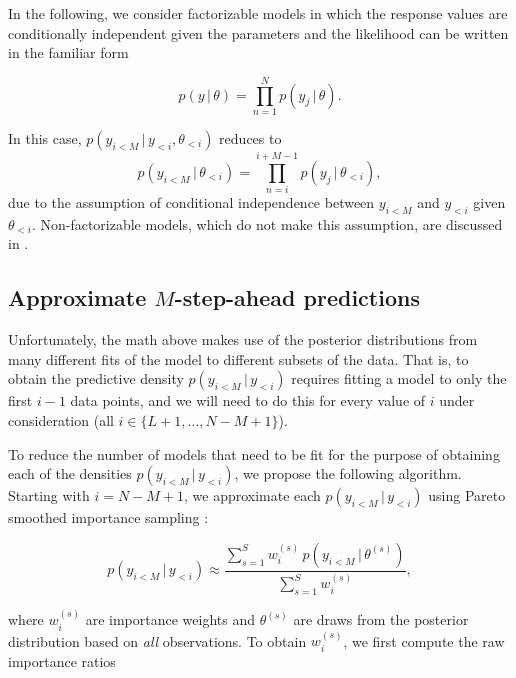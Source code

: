 \documentclass[american,]{article}
\begin{document}
In the following, we consider factorizable models in which the response
values are conditionally independent given the parameters and the
likelihood can be written in the familiar form

\begin{equation}
p(y \,|\, \theta) = \prod_{n=1}^N p(y_j \,|\, \theta).
\end{equation}

In this case, \(p(y_{i<M} \,|\, y_{<i}, \theta_{<i})\) reduces to
\begin{equation}
p(y_{i<M} \,|\, \theta_{<i}) = \prod_{n = i}^{i + M -1} p(y_j \,|\, \theta_{<i}),
\end{equation} due to the assumption of conditional independence between
\(y_{i<M}\) and \(y_{<i}\) given \(\theta_{<i}\). Non-factorizable
models, which do not make this assumption, are discussed in
\citet{buerkner:non-factorizable}.

\hypertarget{approximate_MSAP}{%
\subsection{\texorpdfstring{Approximate \(M\)-step-ahead
predictions}{Approximate M-step-ahead predictions}}\label{approximate_MSAP}}

Unfortunately, the math above makes use of the posterior distributions
from many different fits of the model to different subsets of the data.
That is, to obtain the predictive density \(p(y_{i<M} \,|\, y_{<i})\)
requires fitting a model to only the first \(i-1\) data points, and we
will need to do this for every value of \(i\) under consideration (all
\(i \in \{L + 1, \ldots, N - M + 1\}\)).

To reduce the number of models that need to be fit for the purpose of
obtaining each of the densities \(p(y_{i<M} \,|\, y_{<i})\), we propose
the following algorithm. Starting with \(i = N - M + 1\), we approximate
each \(p(y_{i<M} \,|\, y_{<i})\) using Pareto smoothed importance
sampling \citep[PSIS;][]{vehtari2017loo, vehtari2017psis}:

\begin{equation}
 p(y_{i<M} \,|\, y_{<i}) \approx
   \frac{ \sum_{s=1}^S w_i^{(s)}\, p(y_{i<M} \,|\, \theta^{(s)})}{ \sum_{s=1}^S w_i^{(s)}},
\end{equation}

where \(w_i^{(s)}\) are importance weights and \(\theta^{(s)}\) are
draws from the posterior distribution based on \emph{all} observations.
To obtain \(w_i^{(s)}\), we first compute the raw importance ratios
\end{document}
